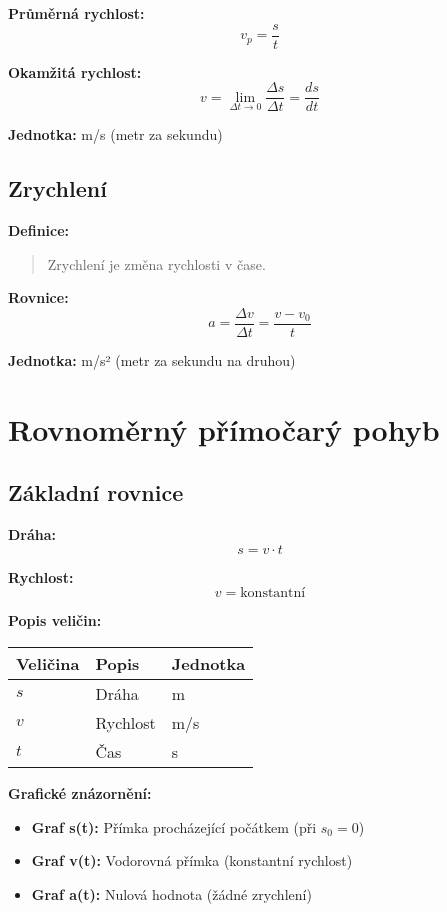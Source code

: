 \documentclass[11pt,a4paper]{article}
\begin{document}
\textbf{Průměrná rychlost:}
\[v_p = \frac{s}{t}\]

\textbf{Okamžitá rychlost:}
\[v = \lim_{\Delta t \to 0} \frac{\Delta s}{\Delta t} = \frac{ds}{dt}\]

\textbf{Jednotka:} m/s (metr za sekundu)

\subsection{Zrychlení}

\textbf{Definice:}
\begin{quote}
Zrychlení je změna rychlosti v čase.
\end{quote}

\textbf{Rovnice:}
\[a = \frac{\Delta v}{\Delta t} = \frac{v - v_0}{t}\]

\textbf{Jednotka:} m/s² (metr za sekundu na druhou)

\clearpage

\section{Rovnoměrný přímočarý pohyb}

\subsection{Základní rovnice}

\textbf{Dráha:}
\[s = v \cdot t\]

\textbf{Rychlost:}
\[v = \text{konstantní}\]

\textbf{Popis veličin:}

\begin{longtable}{lll}
\toprule
Veličina & Popis & Jednotka \\
\midrule
$s$ & Dráha & m \\
$v$ & Rychlost & m/s \\
$t$ & Čas & s \\
\bottomrule
\end{longtable}

\textbf{Grafické znázornění:}
\begin{itemize}
\item \textbf{Graf s(t):} Přímka procházející počátkem (při $s_0 = 0$)
\item \textbf{Graf v(t):} Vodorovná přímka (konstantní rychlost)
\item \textbf{Graf a(t):} Nulová hodnota (žádné zrychlení)
\end{itemize}
\end{document}
